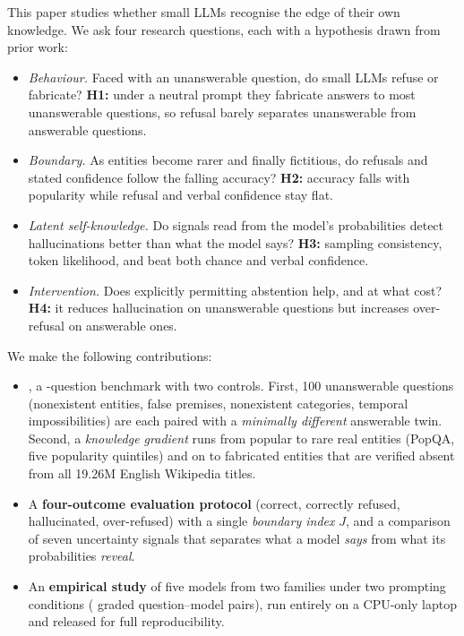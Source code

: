 This paper studies whether small LLMs recognise the edge of their own knowledge. We ask four research questions, each with a hypothesis drawn from prior work:
\begin{itemize}
\item[\textbf{RQ1}] \emph{Behaviour.} Faced with an unanswerable question, do small LLMs refuse or fabricate? \textbf{H1:} under a neutral prompt they fabricate answers to most unanswerable questions, so refusal barely separates unanswerable from answerable questions.
\item[\textbf{RQ2}] \emph{Boundary.} As entities become rarer and finally fictitious, do refusals and stated confidence follow the falling accuracy? \textbf{H2:} accuracy falls with popularity while refusal and verbal confidence stay flat.
\item[\textbf{RQ3}] \emph{Latent self-knowledge.} Do signals read from the model's probabilities detect hallucinations better than what the model says? \textbf{H3:} sampling consistency, token likelihood, \ptrue{} and \pik{} beat both chance and verbal confidence.
\item[\textbf{RQ4}] \emph{Intervention.} Does explicitly permitting abstention help, and at what cost? \textbf{H4:} it reduces hallucination on unanswerable questions but increases over-refusal on answerable ones.
\end{itemize}
We make the following contributions:
\begin{itemize}
\item \textbf{\bench{}}, a -question benchmark with two controls. First, 100 unanswerable questions (nonexistent entities, false premises, nonexistent categories, temporal impossibilities) are each paired with a \emph{minimally different} answerable twin. Second, a \emph{knowledge gradient} runs from popular to rare real entities (PopQA, five popularity quintiles) and on to fabricated entities that are verified absent from all 19.26M English Wikipedia titles.
\item A \textbf{four-outcome evaluation protocol} (correct, correctly refused, hallucinated, over-refused) with a single \emph{boundary index} $J$, and a comparison of seven uncertainty signals that separates what a model \emph{says} from what its probabilities \emph{reveal}.
\item An \textbf{empirical study} of five models from two families under two prompting conditions ( graded question--model pairs), run entirely on a CPU-only laptop and released for full reproducibility.
\end{itemize}


